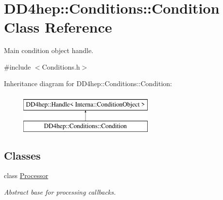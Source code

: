 \hypertarget{class_d_d4hep_1_1_conditions_1_1_condition}{}\section{D\+D4hep\+:\+:Conditions\+:\+:Condition Class Reference}
\label{class_d_d4hep_1_1_conditions_1_1_condition}


Main condition object handle.  




{\ttfamily \#include $<$Conditions.\+h$>$}

Inheritance diagram for D\+D4hep\+:\+:Conditions\+:\+:Condition\+:\begin{figure}[H]
\begin{center}
\leavevmode
\includegraphics[height=2.000000cm]{class_d_d4hep_1_1_conditions_1_1_condition}
\end{center}
\end{figure}
\subsection*{Classes}
\begin{DoxyCompactItemize}
\item 
class \hyperlink{class_d_d4hep_1_1_conditions_1_1_condition_1_1_processor}{Processor}
\begin{DoxyCompactList}\small\item\em Abstract base for processing callbacks. \end{DoxyCompactList}\end{DoxyCompactItemize}
